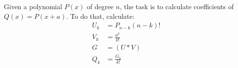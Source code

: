 Given a polynomial $P(x)$ of degree $n$, the task is to calculate coefficients of $Q(x) = P(x + a)$. To do that, calculate: 
\begin{align*}
U_k &= P_{n-k} (n - k)! \\
V_k &= \frac{a^k}{k!} \\
G &= (U \ast V) \\
Q_k &= \frac{G_k}{k!}
\end{align*}

